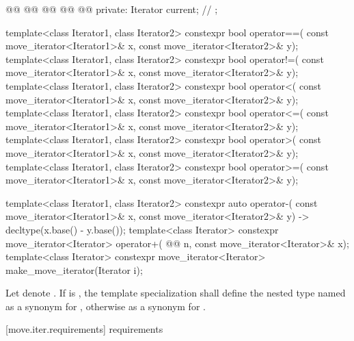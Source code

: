 \begin{codeblock}
{{    @@
      @@
    @@
      @@
        @@
  private:
    Iterator current;   // \expos
  };

  template<class Iterator1, class Iterator2>
    constexpr bool operator==(
      const move_iterator<Iterator1>& x, const move_iterator<Iterator2>& y);
  template<class Iterator1, class Iterator2>
    constexpr bool operator!=(
      const move_iterator<Iterator1>& x, const move_iterator<Iterator2>& y);
  template<class Iterator1, class Iterator2>
    constexpr bool operator<(
      const move_iterator<Iterator1>& x, const move_iterator<Iterator2>& y);
  template<class Iterator1, class Iterator2>
    constexpr bool operator<=(
      const move_iterator<Iterator1>& x, const move_iterator<Iterator2>& y);
  template<class Iterator1, class Iterator2>
    constexpr bool operator>(
      const move_iterator<Iterator1>& x, const move_iterator<Iterator2>& y);
  template<class Iterator1, class Iterator2>
    constexpr bool operator>=(
      const move_iterator<Iterator1>& x, const move_iterator<Iterator2>& y);

  template<class Iterator1, class Iterator2>
    constexpr auto operator-(
      const move_iterator<Iterator1>& x,
      const move_iterator<Iterator2>& y) -> decltype(x.base() - y.base());
  template<class Iterator>
    constexpr move_iterator<Iterator> operator+(
      @@ n,
      const move_iterator<Iterator>& x);
  template<class Iterator>
    constexpr move_iterator<Iterator> make_move_iterator(Iterator i);
}
\end{codeblock}

\begin{removedblock}
\pnum
Let  denote .
If  is ,
the template specialization  shall define
the nested type named  as a synonym for
,
otherwise as a synonym for .
\end{removedblock}

[move.iter.requirements]{ requirements}


